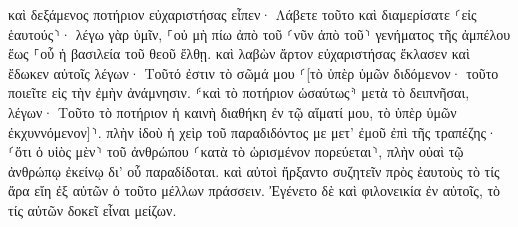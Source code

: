 \documentclass{openreader}
\begin{document}
καὶ δεξάμενος ποτήριον εὐχαριστήσας εἶπεν· Λάβετε τοῦτο καὶ διαμερίσατε ⸂εἰς ἑαυτούς⸃· 
λέγω γὰρ ὑμῖν, ⸀οὐ μὴ πίω ἀπὸ τοῦ ⸂νῦν ἀπὸ τοῦ⸃ γενήματος τῆς ἀμπέλου ἕως ⸀οὗ ἡ βασιλεία τοῦ θεοῦ ἔλθῃ. 
καὶ λαβὼν ἄρτον εὐχαριστήσας ἔκλασεν καὶ ἔδωκεν αὐτοῖς λέγων· Τοῦτό ἐστιν τὸ σῶμά μου ⸂[τὸ ὑπὲρ ὑμῶν διδόμενον· τοῦτο ποιεῖτε εἰς τὴν ἐμὴν ἀνάμνησιν. 
⸄καὶ τὸ ποτήριον ὡσαύτως⸅ μετὰ τὸ δειπνῆσαι, λέγων· Τοῦτο τὸ ποτήριον ἡ καινὴ διαθήκη ἐν τῷ αἵματί μου, τὸ ὑπὲρ ὑμῶν ἐκχυννόμενον]⸃. 
πλὴν ἰδοὺ ἡ χεὶρ τοῦ παραδιδόντος με μετ’ ἐμοῦ ἐπὶ τῆς τραπέζης· 
⸂ὅτι ὁ υἱὸς μὲν⸃ τοῦ ἀνθρώπου ⸂κατὰ τὸ ὡρισμένον πορεύεται⸃, πλὴν οὐαὶ τῷ ἀνθρώπῳ ἐκείνῳ δι’ οὗ παραδίδοται. 
καὶ αὐτοὶ ἤρξαντο συζητεῖν πρὸς ἑαυτοὺς τὸ τίς ἄρα εἴη ἐξ αὐτῶν ὁ τοῦτο μέλλων πράσσειν. 
Ἐγένετο δὲ καὶ φιλονεικία ἐν αὐτοῖς, τὸ τίς αὐτῶν δοκεῖ εἶναι μείζων. 
\end{document}

